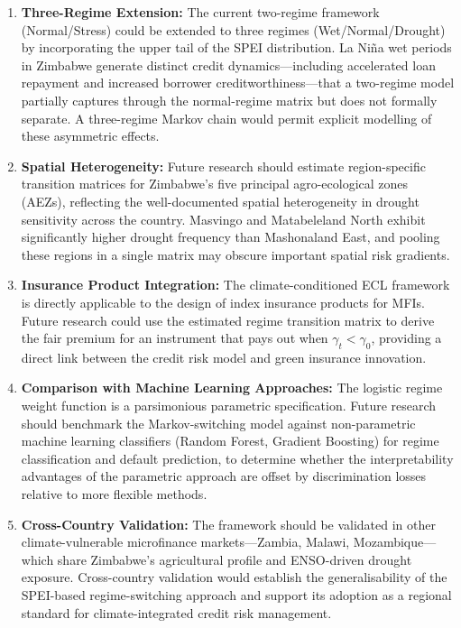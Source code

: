 \documentclass[12pt,a4paper]{article}
\begin{document}
\begin{enumerate}[noitemsep]
    \item \textbf{Three-Regime Extension:} The current two-regime framework (Normal/Stress) could be extended to three regimes (Wet/Normal/Drought) by incorporating the upper tail of the SPEI distribution. La Niña wet periods in Zimbabwe generate distinct credit dynamics---including accelerated loan repayment and increased borrower creditworthiness---that a two-regime model partially captures through the normal-regime matrix but does not formally separate. A three-regime Markov chain would permit explicit modelling of these asymmetric effects.

    \item \textbf{Spatial Heterogeneity:} Future research should estimate region-specific transition matrices for Zimbabwe's five principal agro-ecological zones (AEZs), reflecting the well-documented spatial heterogeneity in drought sensitivity across the country. Masvingo and Matabeleland North exhibit significantly higher drought frequency than Mashonaland East, and pooling these regions in a single matrix may obscure important spatial risk gradients.

    \item \textbf{Insurance Product Integration:} The climate-conditioned ECL framework is directly applicable to the design of index insurance products for MFIs. Future research could use the estimated regime transition matrix to derive the fair premium for an instrument that pays out when $\gamma_t < \gamma_0$, providing a direct link between the credit risk model and green insurance innovation.

    \item \textbf{Comparison with Machine Learning Approaches:} The logistic regime weight function is a parsimonious parametric specification. Future research should benchmark the Markov-switching model against non-parametric machine learning classifiers (Random Forest, Gradient Boosting) for regime classification and default prediction, to determine whether the interpretability advantages of the parametric approach are offset by discrimination losses relative to more flexible methods.

    \item \textbf{Cross-Country Validation:} The framework should be validated in other climate-vulnerable microfinance markets---Zambia, Malawi, Mozambique---which share Zimbabwe's agricultural profile and ENSO-driven drought exposure. Cross-country validation would establish the generalisability of the SPEI-based regime-switching approach and support its adoption as a regional standard for climate-integrated credit risk management.
\end{enumerate}
\end{document}
